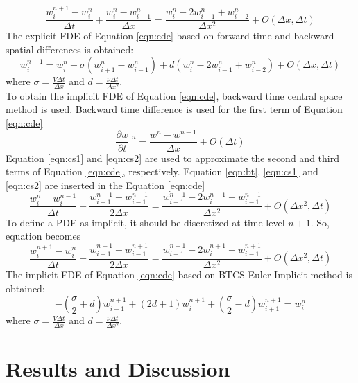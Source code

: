 \documentclass[letterpaper,12pt]{article}
\begin{document}
\begin{equation}
	\frac{w_{i}^{n+1}-{w_{i}^{n}}}{\Delta t}+\frac{w_{i}^{n}-w_{i-1}^{n}}{\Delta x}
	=\frac{w_{i}^{n}-2w_{i-1}^{n}+w_{i-2}^{n}}{\Delta x^2}+O(\Delta x,\Delta t)
\end{equation}
The explicit FDE of Equation \ref{eqn:cde} based on forward time and backward spatial
differences is obtained:
\begin{equation}
	w_{i}^{n+1}= w_{i}^{n}-\sigma(w_{i+1}^{n}-w_{i-1}^{n})+d(w_{i}^{n}-2w_{i-1}^{n}+w_{i-2}^{n})+O(\Delta x,\Delta t)
\end{equation}
where $\sigma = \frac{V\Delta t}{\Delta x }$ and $d = \frac{\nu\Delta t}{\Delta x^2 }$.
\\ To obtain the implicit FDE of Equation \ref{eqn:cde}, backward time central space method is used.
Backward time difference is used for the first term of Equation \ref{eqn:cde}
\begin{equation}
	\frac{\partial w}{\partial t}\vert^{n}=\frac{w^{n}-w^{n-1}}{\Delta x}+O(\Delta t)
	\label{eqn:bt}
\end{equation}
Equation \ref{eqn:cs1} and \ref{eqn:cs2} are used to approximate the second and third
terms of Equation \ref{eqn:cde}, respectively. Equation \ref{eqn:bt}, \ref{eqn:cs1}
and \ref{eqn:cs2} are inserted in the Equation \ref{eqn:cde}
\begin{equation}
	\frac{w_{i}^{n}-{w_{i}^{n-1}}}{\Delta t}+\frac{w_{i+1}^{n-1}-w_{i-1}^{n-1}}{2\Delta x}
	=\frac{w_{i+1}^{n-1}-2w_{i}^{n-1}+w_{i-1}^{n-1}}{\Delta x^2}+O(\Delta x^2, \Delta t)
\end{equation}
To define a PDE as implicit, it should be discretized at time level $n+1$. So, equation becomes
\begin{equation}
	\frac{w_{i}^{n+1}-{w_{i}^{n}}}{\Delta t}+\frac{w_{i+1}^{n+1}-w_{i-1}^{n+1}}{2\Delta x}
	=\frac{w_{i+1}^{n+1}-2w_{i}^{n+1}+w_{i-1}^{n+1}}{\Delta x^2}+O(\Delta x^2, \Delta t)	
\end{equation}
The implicit FDE of Equation \ref{eqn:cde} based on BTCS Euler Implicit method is obtained:
\begin{equation}
	-(\frac{\sigma}{2}+d)w_{i-1}^{n+1}+(2d+1)w_{i}^{n+1}+(\frac{\sigma}{2}-d)w_{i+1}^{n+1} = w_{i}^{n}
	\label{eqn:implicit}
\end{equation}
where $\sigma = \frac{V\Delta t}{\Delta x }$ and $d = \frac{\nu\Delta t}{\Delta x^2 }$.
\newpage
\section{Results and Discussion}
\end{document}

